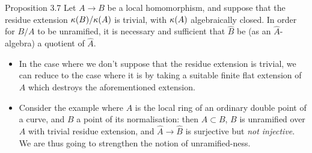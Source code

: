 \begin{itenv}{Proposition 3.7}
  Let $A\to B$ be a local homomorphism, and suppose that the residue extension $\kappa(B)/\kappa(A)$ is trivial, with $\kappa(A)$ algebraically closed.
  In order for $B/A$ to be unramified, it is necessary and sufficient that $\widehat{B}$ be (as an $\widehat{A}$-algebra) a quotient of $\widehat{A}$.
\end{itenv}

\begin{rem}
  \begin{itemize}
    \item In the case where we don't suppose that the residue extension is trivial, we can reduce to the case where it is by taking a suitable finite flat extension of $A$ which destroys the aforementioned extension.
    \item Consider the example where $A$ is the local ring of an ordinary double point of a curve, and $B$ a point of its normalisation:
      then $A\subset B$, $B$ is unramified over $A$ with trivial residue extension,
      and $\widehat{A}\to\widehat{B}$ is surjective but \emph{not injective}.
    We are thus going to strengthen the notion of unramified-ness.
  \end{itemize}
\end{rem}
